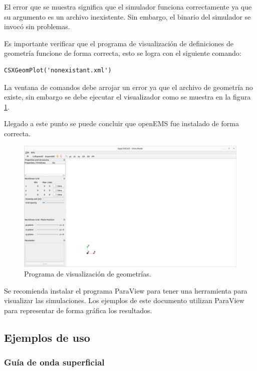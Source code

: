 \documentclass[
    11pt,
    spanish,
	a4paper
]{article}
\begin{document}
El error que se muestra significa que el simulador funciona correctamente ya que
su argumento es un archivo inexistente. Sin embargo, el binario del simulador se
invocó sin problemas.

Es importante verificar que el programa de visualización de definiciones de
geometría funcione de forma correcta, esto se logra con el siguiente comando:

\begin{verbatim}
CSXGeomPlot('nonexistant.xml')
\end{verbatim}

La ventana de comandos debe arrojar un error ya que el archivo de geometría no
existe, sin embargo se debe ejecutar el visualizador como se muestra en la
figura \ref{fig:geovisual}.

Llegado a este punto se puede concluir que openEMS fue instalado de forma correcta.

\begin{figure}[htbp]
	\centering
	\includegraphics[width=\textwidth]{./img/geovisual.png}
	\caption{Programa de visualización de geometrías.}
	\label{fig:geovisual}
\end{figure}

Se recomienda instalar el programa ParaView para tener una herramienta para
visualizar las simulaciones.
Los ejemplos de este documento utilizan ParaView para representar de forma
gráfica los resultados.

\subsection{Ejemplos de uso}
\label{sub:oejemplos}

\subsubsection{Guía de onda superficial}
\label{subsub:oejemplo1}
\end{document}
